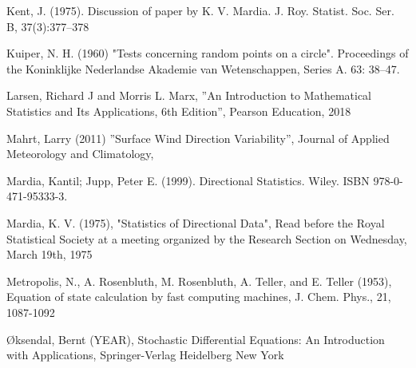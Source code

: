 \documentclass[11pt]{article}
\numberwithin{equation}{section}
\numberwithin{figure}{section}
\begin{document}
\begin{thebibliography}{1}
 Kent, J. (1975). Discussion of paper by K. V. Mardia. J. Roy. Statist. Soc. Ser. B, 37(3):377–378

 Kuiper, N. H. (1960) "Tests concerning random points on a circle". Proceedings of the Koninklijke Nederlandse Akademie van Wetenschappen, Series A. 63: 38–47.

Larsen, Richard J and Morris L. Marx, ''An Introduction to Mathematical Statistics and Its Applications, 6th Edition'', Pearson Education, 2018

 Mahrt, Larry (2011) ''Surface Wind Direction Variability'',  Journal of Applied Meteorology and Climatology, 

Mardia, Kantil; Jupp, Peter E. (1999). Directional Statistics. Wiley. ISBN 978-0-471-95333-3.

 Mardia, K. V. (1975), "Statistics of Directional Data", Read before the Royal Statistical Society at a meeting organized by the Research Section on Wednesday, March 19th, 1975

Metropolis, N., A.  Rosenbluth, M.  Rosenbluth, A.  Teller, and E. Teller (1953), Equation of state calculation by fast computing machines, J. Chem. Phys., 21, 1087-1092

 Øksendal, Bernt (YEAR), Stochastic Differential Equations: An Introduction with Applications, Springer-Verlag Heidelberg New York



\end{thebibliography}
\end{document}
